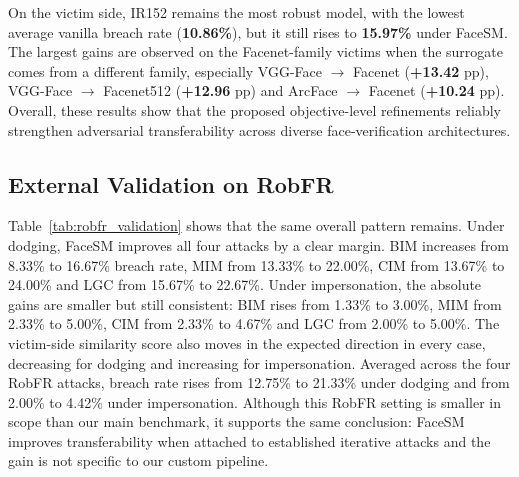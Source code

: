 \documentclass[a4paper,fleqn]{cas-dc}
\begin{document}
On the victim side, IR152 remains the most robust model, with the lowest average vanilla breach rate (\textbf{10.86\%}), but it still rises to \textbf{15.97\%} under FaceSM. The largest gains are observed on the Facenet-family victims when the surrogate comes from a different family, especially VGG-Face $\rightarrow$ Facenet (\textbf{+13.42} pp), VGG-Face $\rightarrow$ Facenet512 (\textbf{+12.96} pp) and ArcFace $\rightarrow$ Facenet (\textbf{+10.24} pp). Overall, these results show that the proposed objective-level refinements reliably strengthen adversarial transferability across diverse face-verification architectures.



\subsection{External Validation on RobFR}
\label{subsec:robfr_validation}

Table~\ref{tab:robfr_validation} shows that the same overall pattern remains. Under dodging, FaceSM improves all four attacks by a clear margin. BIM increases from 8.33\% to 16.67\% breach rate, MIM from 13.33\% to 22.00\%, CIM from 13.67\% to 24.00\% and LGC from 15.67\% to 22.67\%. Under impersonation, the absolute gains are smaller but still consistent: BIM rises from 1.33\% to 3.00\%, MIM from 2.33\% to 5.00\%, CIM from 2.33\% to 4.67\% and LGC from 2.00\% to 5.00\%. The victim-side similarity score also moves in the expected direction in every case, decreasing for dodging and increasing for impersonation. Averaged across the four RobFR attacks, breach rate rises from 12.75\% to 21.33\% under dodging and from 2.00\% to 4.42\% under impersonation. Although this RobFR setting is smaller in scope than our main benchmark, it supports the same conclusion: FaceSM improves transferability when attached to established iterative attacks and the gain is not specific to our custom pipeline.
\end{document}
